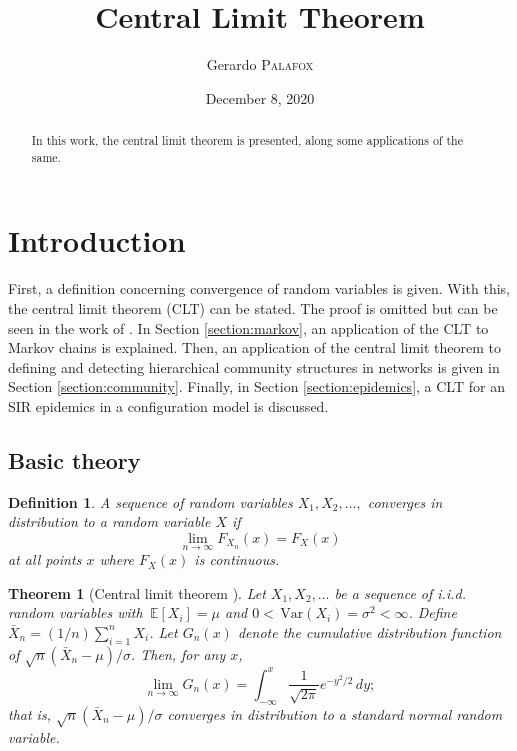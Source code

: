 \documentclass[letterpaper, 10 pt, conference]{article}
\title{Central Limit Theorem
}
\date{December 8, 2020}
\author{Gerardo {\textsc{Palafox}}}
\newtheorem{thm}{Theorem}
\newtheorem{defn}{Definition}
\newcommand\var[1]{\, \mathrm{Var} \left( #1 \right)}
\newcommand\expec[1]{\, \mathbb{E} \left\lbrack #1 \right\rbrack}
\begin{document}
\maketitle
\begin{abstract}
	In this work, the central limit theorem is presented, along some applications of the same.
\end{abstract}
\section{Introduction}
First, a definition concerning convergence of random variables is given. With this, the central limit theorem (CLT) can be stated. The proof is omitted but can be seen in the work of \cite{Casella_Berger_2002}. In Section \ref{section:markov}, an application of the  CLT to Markov chains is explained. Then, an application of the central limit theorem to defining and detecting hierarchical community structures in networks is given in Section \ref{section:community}. Finally, in Section \ref{section:epidemics}, a CLT for an SIR epidemics in a configuration model is discussed.

\subsection{Basic theory}

\begin{defn}
	A sequence of random variables $X_1, X_2, \dots,$ converges in distribution to a random variable $X$ if 
	\begin{equation}
		\lim_{n \rightarrow \infty} F_{X_n} (x) = F_X (x)
	\end{equation}
	at all points $x$ where $F_{X} (x)$ is continuous.
\end{defn} 

\begin{thm}[Central limit theorem \citep{Casella_Berger_2002}]
Let $X_1, X_2, \dots$ be a sequence of i.i.d. random variables with $\expec{X_i}  = \mu$ and $0 < \var{X_i} = \sigma^2 < \infty$. Define $\bar{X}_n = (1/n) \sum_{i = 1}^{n} X_i$. Let $G_n (x)$ denote the cumulative distribution function of $\sqrt{n} (\bar{X}_n - \mu)/\sigma$. Then, for any $x$,
\begin{equation}
	\lim_{n \rightarrow \infty} G_n (x) = \int_{-\infty}^{x} \frac{1}{\sqrt{2 \pi}} e^{-y^2 / 2} \, dy ;
\end{equation}
that is, $\sqrt{n} (\bar{X}_n - \mu)/\sigma$ converges in distribution to a standard normal random variable.
\end{thm}
\end{document}
